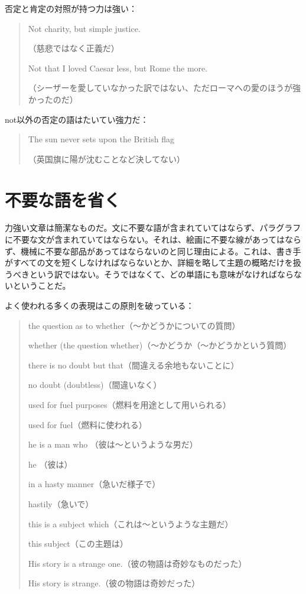否定と肯定の対照が持つ力は強い：
\begin{quote}
    Not charity, but simple justice.
    
    （慈悲ではなく正義だ）
    
    Not that I loved Caesar less, but Rome the more.
    
    （シーザーを愛していなかった訳ではない、ただローマへの愛のほうが強かったのだ）
\end{quote}
not以外の否定の語はたいてい強力だ：
\begin{quote}
    The sun never sets upon the British flag
    
    （英国旗に陽が沈むことなど決してない）
\end{quote}
\section{不要な語を省く}
力強い文章は簡潔なものだ。文に不要な語が含まれていてはならず、パラグラフに不要な文が含まれていてはならない。それは、絵画に不要な線があってはならず、機械に不要な部品があってはならないのと同じ理由による。これは、書き手がすべての文を短くしなければならないとか、詳細を略して主題の概略だけを扱うべきという訳ではない。そうではなくて、どの単語にも意味がなければならないということだ。
\par
よく使われる多くの表現はこの原則を破っている：
\begin{quote}
    the question as to whether（～かどうかについての質問）
    
    whether (the question whether)（～かどうか（～かどうかという質問）
    
    there is no doubt but that（間違える余地もないことに）
    
    no doubt (doubtless)（間違いなく）
    
    used for fuel purposes（燃料を用途として用いられる）
    
    used for fuel（燃料に使われる）
    
    he is a man who （彼は～というような男だ）
    
    he （彼は）
    
    in a hasty manner（急いだ様子で）
    
    hastily（急いで）
    
    this is a subject which（これは～というような主題だ）
    
    this subject（この主題は）
    
    His story is a strange one.（彼の物語は奇妙なものだった）
    
    His story is strange.（彼の物語は奇妙だった）
\end{quote}

